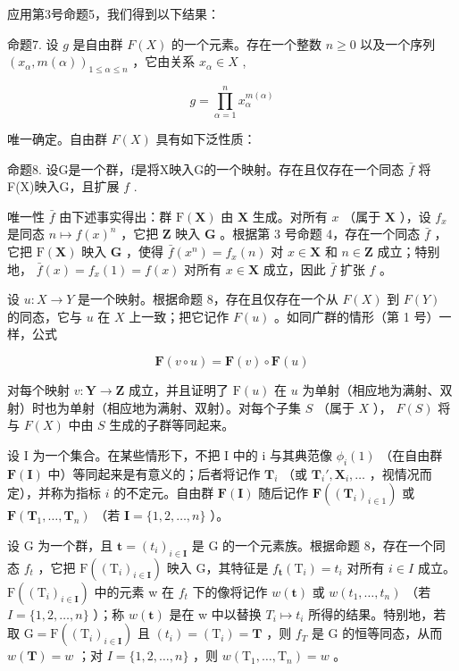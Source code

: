 应用第3号命题5，我们得到以下结果：

命题7. 设 \(g\) 是自由群 \(F(X)\) 的一个元素。存在一个整数 \(n \geqslant 0\) 以及一个序列 \((x_{\alpha}, m(\alpha))_{1 \leqslant \alpha \leqslant n}\) ，它由关系 \(x_{\alpha} \in X\) ,

\[
g = \prod_ {\alpha = 1} ^ {n} x _ {\alpha} ^ {m (\alpha)}
\]

唯一确定。自由群 \(F(X)\) 具有如下泛性质：

命题8. 设G是一个群，f是将X映入G的一个映射。存在且仅存在一个同态 \(\bar{f}\) 将F(X)映入G，且扩展 \(f\) .

唯一性 \(\bar{f}\) 由下述事实得出：群 \(\mathrm{F}(\mathbf{X})\) 由 \(\mathbf{X}\) 生成。对所有 \(x\) （属于 \(\mathbf{X}\) ），设 \(f_x\) 是同态 \(n \mapsto f(x)^n\) ，它把 \(\mathbf{Z}\) 映入 \(\mathbf{G}\) 。根据第 3 号命题 4，存在一个同态 \(\bar{f}\) ，它把 \(\mathrm{F}(\mathbf{X})\) 映入 \(\mathbf{G}\) ，使得 \(\bar{f}(x^n) = f_x(n)\) 对 \(x \in \mathbf{X}\) 和 \(n \in \mathbf{Z}\) 成立；特别地， \(\bar{f}(x) = f_x(1) = f(x)\) 对所有 \(x \in \mathbf{X}\) 成立，因此 \(\bar{f}\) 扩张 \(f\) 。

设 \(u: X \to Y\) 是一个映射。根据命题 8，存在且仅存在一个从 \(F(X)\) 到 \(F(Y)\) 的同态，它与 \(u\) 在 \(X\) 上一致；把它记作 \(F(u)\) 。如同广群的情形（第 1 号）一样，公式

\[
\mathbf {F} (v \circ u) = \mathbf {F} (v) \circ \mathbf {F} (u)
\]

对每个映射 \(v: \mathbf{Y} \to \mathbf{Z}\) 成立，并且证明了 \(\mathrm{F}(u)\) 在 \(u\) 为单射（相应地为满射、双射）时也为单射（相应地为满射、双射）。对每个子集 \(S\) （属于 \(X\) ）， \(F(S)\) 将与 \(F(X)\) 中由 \(S\) 生成的子群等同起来。

设 I 为一个集合。在某些情形下，不把 I 中的 i 与其典范像 \(\phi_i(1)\) （在自由群 \(\mathbf{F}(\mathbf{I})\) 中）等同起来是有意义的；后者将记作 \(\mathbf{T}_i\) （或 \(\mathbf{T}_i', \mathbf{X}_i, \ldots\) ，视情况而定），并称为指标 \(i\) 的不定元。自由群 \(\mathbf{F}(\mathbf{I})\) 随后记作 \(\mathbf{F}((\mathbf{T}_i)_{i \in 1})\) 或 \(\mathbf{F}(\mathbf{T}_1, \ldots, \mathbf{T}_n)\) （若 \(\mathbf{I} = \{1, 2, \ldots, n\}\) ）。

设 G 为一个群，且 \(\mathbf{t} = (t_{i})_{i \in \mathbf{I}}\) 是 G 的一个元素族。根据命题 8，存在一个同态 \(f_{t}\) ，它把 \(\mathrm{F}((\mathrm{T}_{i})_{i \in \mathbf{I}})\) 映入 G，其特征是 \(f_{\mathbf{t}}(\mathrm{T}_{i}) = t_{i}\) 对所有 \(i \in I\) 成立。 \(\mathrm{F}((\mathrm{T}_{i})_{i \in \mathbf{I}})\) 中的元素 w 在 \(f_{t}\) 下的像将记作 \(w(\mathbf{t})\) 或 \(w(t_{1}, \ldots, t_{n})\) （若 \(I = \{1, 2, \ldots, n\}\) ）；称 \(w(\mathbf{t})\) 是在 w 中以替换 \(T_{i} \mapsto t_{i}\) 所得的结果。特别地，若取 \(\mathrm{G} = \mathrm{F}((\mathrm{T}_{i})_{i \in \mathbf{I}})\) 且 \((t_{i}) = (\mathrm{T}_{i}) = \mathbf{T}\) ，则 \(f_{T}\) 是 G 的恒等同态，从而 \(w(\mathbf{T}) = w\) ；对 \(I = \{1, 2, \ldots, n\}\) ，则 \(w(\mathrm{T}_{1}, \ldots, \mathrm{T}_{n}) = w\) 。

